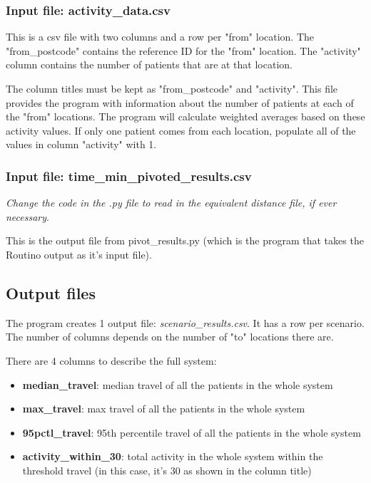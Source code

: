 \documentclass{article}
\begin{document}
\begin{flushleft}
\subsubsection{Input file: activity\_data.csv}

This is a csv file with two columns and a row per "from" location.
The "from\_postcode" contains the reference ID for the "from" location.
The "activity" column contains the number of patients that are at that location.
\vspace{\baselineskip}

The column titles must be kept as "from\_postcode" and "activity".
\vspace{\baselineskip}
This file provides the program with information about the number of patients at each of the "from" locations. The program will calculate weighted averages based on these activity values. If only one patient comes from each location, populate all of the values in column "activity" with 1.

\subsubsection{Input file: time\_min\_pivoted\_results.csv}

\textit{Change the code in the .py file to read in the equivalent distance file, if ever necessary}.

This is the output file from pivot\_results.py (which is the program that takes the Routino output as it's input file).

\subsection{Output files}

The program creates 1 output file: \textit{scenario\_results.csv}. It has a row per scenario.
The number of columns depends on the number of "to" locations there are.
\vspace{\baselineskip}

There are 4 columns to describe the full system:
\begin{itemize}
	\item \textbf{median\_travel}: median travel of all the patients in the whole system
	\item \textbf{max\_travel}: max travel of all the patients in the whole system
	\item \textbf{95pctl\_travel}: 95th percentile travel of all the patients in the whole system
	\item \textbf{activity\_within\_30}: total activity in the whole system within the threshold travel (in this case, it's 30 as shown in the column title)
\end{itemize}


\end{flushleft}
\end{document}
